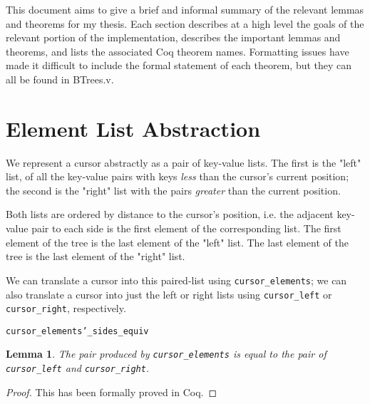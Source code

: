\documentclass[12pt]{article}
\newtheorem{lemma}[theorem]{Lemma}
\begin{document}

\newcommand{\hmwkClass}{Thesis}
\newcommand{\hmwkSemester}{Spring 2018}

\newcommand{\hmwkAuthorName}{Brian McSwiggen}
\newcommand{\hmwkAuthorID}{bm14}


This document aims to give a brief and informal summary of the relevant lemmas and theorems for my thesis. Each section describes at a high level the goals of the relevant portion of the implementation, describes the important lemmas and theorems, and lists the associated Coq theorem names. Formatting issues have made it difficult to include the formal statement of each theorem, but they can all be found in BTrees.v.

\section{Element List Abstraction}

We represent a cursor abstractly as a pair of key-value lists. The first is the "left" list, of all the key-value pairs with keys \textit{less} than the cursor's current position; the second is the "right" list with the pairs \textit{greater} than the current position.

Both lists are ordered by distance to the cursor's position, i.e. the adjacent key-value pair to each side is the first element of the corresponding list. The first element of the tree is the last element of the "left" list. The last element of the tree is the last element of the "right" list.

We can translate a cursor into this paired-list using \texttt{cursor\_elements}; we can also translate a cursor into just the left or right lists using \texttt{cursor\_left} or \texttt{cursor\_right}, respectively.

\bigskip
\texttt{cursor\_elements'\_sides\_equiv}

\begin{lemma}
The pair produced by \texttt{cursor\_elements} is equal to the pair of \texttt{cursor\_left} and \texttt{cursor\_right}.
\end{lemma}

\begin{proof}
This has been formally proved in Coq.
\end{proof}
\end{document}
